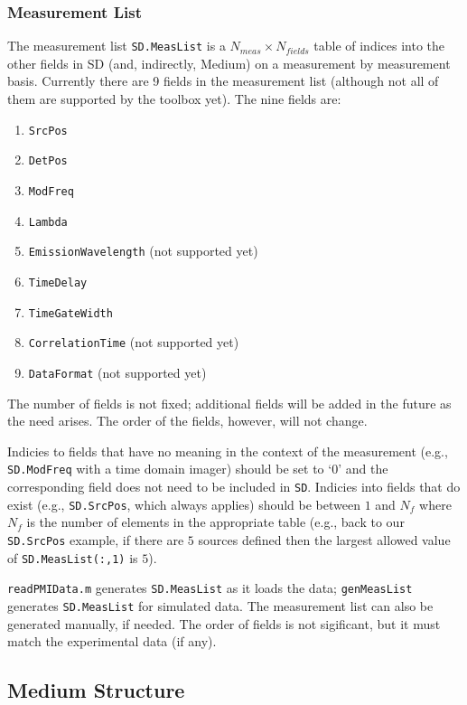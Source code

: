 \documentclass[12pt]{article}
\newcommand{\pmifield}[1]{{\tt #1}}
\begin{document}
\subsubsection{Measurement List}

The measurement list \pmifield{SD.MeasList} is a $N_{meas}\times
N_{fields}$ table of indices into the other fields in SD (and,
indirectly, Medium) on a measurement by measurement basis.  Currently
there are 9 fields in the measurement list (although not all of them
are supported by the toolbox yet).  The nine fields are:
\begin{enumerate}
\item \pmifield{SrcPos}
\item \pmifield{DetPos}
\item \pmifield{ModFreq}
\item \pmifield{Lambda}
\item \pmifield{EmissionWavelength} (not supported yet)
\item \pmifield{TimeDelay}
\item \pmifield{TimeGateWidth}
\item \pmifield{CorrelationTime} (not supported yet)
\item \pmifield{DataFormat} (not supported yet)
\end{enumerate}
The number of fields is not fixed; additional fields will be added in
the future as the need arises.  The order of the fields, however,
will not change.

Indicies to fields that have no meaning in the context of the
measurement (e.g., \pmifield{SD.ModFreq} with a time domain imager)
should be set to `0' and the corresponding field does not need to be
included in \pmifield{SD}.  Indicies into fields that do exist (e.g.,
\pmifield{SD.SrcPos}, which always applies) should be between $1$ and
$N_f$ where $N_f$ is the number of elements in the appropriate table
(e.g., back to our \pmifield{SD.SrcPos} example, if there are $5$
sources defined then the largest allowed value of
\pmifield{SD.MeasList(:,1)} is $5$).

\pmifield{readPMIData.m} generates \pmifield{SD.MeasList} as it loads
the data; \pmifield{genMeasList} generates \pmifield{SD.MeasList} for
simulated data.  The measurement list can also be generated manually,
if needed.  The order of fields is not sigificant, but it must
match the experimental data (if any).

\subsection{Medium Structure}
\end{document}
